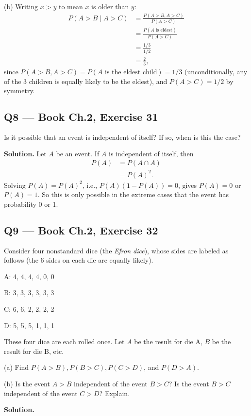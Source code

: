 \documentclass[11pt]{article}
\begin{document}
(b) Writing $x > y$ to mean $x$ is older than $y$:
\begin{align*}
P(A>B \mid A>C) &= \frac{P(A>B, A>C)}{P(A>C)} \\
&= \frac{P(A \text{ is eldest})}{P(A>C)} \\
&= \frac{1/3}{1/2} \\
&= \frac{2}{3},
\end{align*}
since $P(A>B, A>C) = P(A \text{ is the eldest child}) = 1/3$ (unconditionally, any of the 3 children is equally likely to be the eldest), and $P(A>C) = 1/2$ by symmetry.

\subsection*{Q8 --- Book Ch.2, Exercise 31}
\begin{qbox}
Is it possible that an event is independent of itself? If so, when is this the case?
\end{qbox}
\textbf{Solution.} Let $A$ be an event. If $A$ is independent of itself, then
\begin{align*}
P(A) &= P(A \cap A) \\
&= P(A)^2.
\end{align*}
Solving $P(A) = P(A)^2$, i.e., $P(A)(1-P(A)) = 0$, gives $P(A) = 0$ or $P(A) = 1$. So this is only possible in the extreme cases that the event has probability 0 or 1.

\subsection*{Q9 --- Book Ch.2, Exercise 32}
\begin{qbox}
Consider four nonstandard dice (the \textit{Efron dice}), whose sides are labeled as follows (the 6 sides on each die are equally likely).

A: 4, 4, 4, 4, 0, 0

B: 3, 3, 3, 3, 3, 3

C: 6, 6, 2, 2, 2, 2

D: 5, 5, 5, 1, 1, 1

These four dice are each rolled once. Let $A$ be the result for die A, $B$ be the result for die B, etc.

(a) Find $P(A>B), P(B>C), P(C>D)$, and $P(D>A)$.

(b) Is the event $A>B$ independent of the event $B>C$? Is the event $B>C$ independent of the event $C>D$? Explain.
\end{qbox}
\textbf{Solution.}
\end{document}
